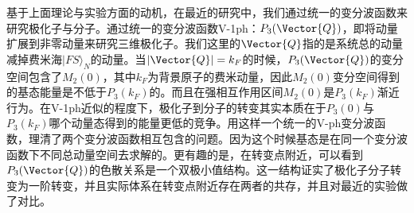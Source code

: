 基于上面理论与实验方面的动机，在最近的研究中，我们通过统一的变分波函数来研究极化子与分子\cite{Cui2020Fermi}。通过统一的变分波函数V-1ph：$P_3(\Vector{Q})$，即将动量扩展到非零动量来研究三维极化子。我们这里的$\Vector{Q}$指的是系统总的动量减掉费米海$|FS\rangle_N$的动量。当$|\Vector{Q}|=k_F$的时候，$P_3(\Vector{Q})$的变分空间包含了$M_2(0)$，其中$k_F$为背景原子的费米动量，因此$M_2(0)$变分空间得到的基态能量是不低于$P_3(k_F)$的。而且在强相互作用区间$M_2(0)$是$P_3(k_F)$渐近行为。在V-1ph近似的程度下，极化子到分子的转变其实本质在于$P_3(0)$与$P_3(k_F)$哪个动量态得到的能量更低的竞争。用这样一个统一的V-ph变分波函数，理清了两个变分波函数相互包含\cite{edwards2013smooth}的问题。因为这个时候基态是在同一个变分波函数下不同总动量空间去求解的。更有趣的是，在转变点附近，可以看到$P_3(\Vector{Q})$的色散关系是一个双极小值结构。这一结构证实了极化子分子转变为一阶转变，并且实际体系在转变点附近存在两者的共存，并且对最近的实验做了对比。

